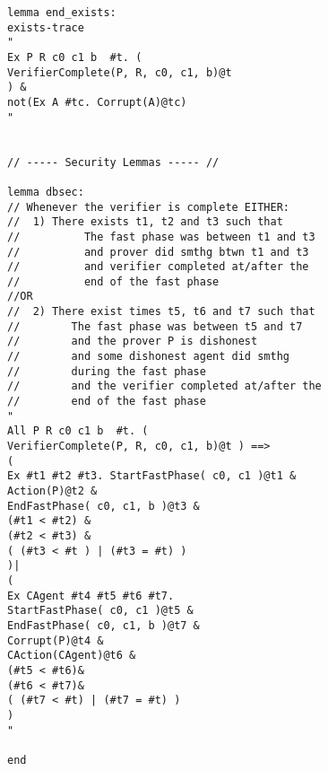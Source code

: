 \begin{lstlisting}
lemma end_exists:
exists-trace
"
Ex P R c0 c1 b  #t. (
VerifierComplete(P, R, c0, c1, b)@t
) &
not(Ex A #tc. Corrupt(A)@tc)
"


// ----- Security Lemmas ----- //

lemma dbsec:
// Whenever the verifier is complete EITHER:
//  1) There exists t1, t2 and t3 such that
//          The fast phase was between t1 and t3
//          and prover did smthg btwn t1 and t3
//          and verifier completed at/after the
//          end of the fast phase
//OR
//  2) There exist times t5, t6 and t7 such that
//        The fast phase was between t5 and t7
//        and the prover P is dishonest
//        and some dishonest agent did smthg 
//        during the fast phase
//        and the verifier completed at/after the
//        end of the fast phase 
"
All P R c0 c1 b  #t. (
VerifierComplete(P, R, c0, c1, b)@t ) ==>                   
(                                                         
Ex #t1 #t2 #t3. StartFastPhase( c0, c1 )@t1 &              
Action(P)@t2 &                              
EndFastPhase( c0, c1, b )@t3 &            
(#t1 < #t2) &                               
(#t2 < #t3) &                               
( (#t3 < #t ) | (#t3 = #t) )
)|
(              
Ex CAgent #t4 #t5 #t6 #t7.
StartFastPhase( c0, c1 )@t5 &    
EndFastPhase( c0, c1, b )@t7 & 
Corrupt(P)@t4 &             
CAction(CAgent)@t6 &             
(#t5 < #t6)&                     
(#t6 < #t7)&                     
( (#t7 < #t) | (#t7 = #t) )      
) 
"

end
\end{lstlisting}

